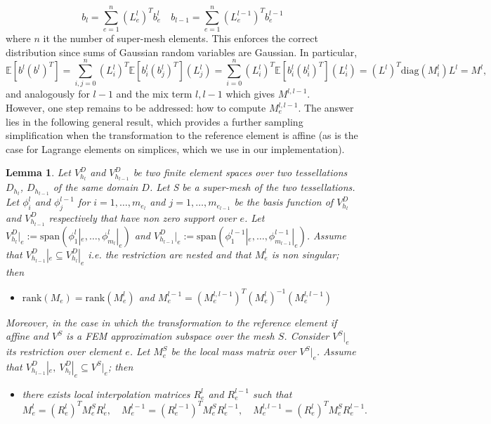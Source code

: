 \documentclass[a4paper, 11pt, oneside]{scrartcl}
\newtheorem{lemma}{Lemma}
\begin{document}
\begin{equation}
b_l = \sum_{e=1}^n (L_e^l)^T b_e^l \quad b_{l-1} = \sum_{e=1}^n (L_e^{l-1})^T b_e^{l-1}
\end{equation}
where \(n\) it the number of super-mesh elements. 
This enforces the correct distribution since sums of Gaussian random variables are Gaussian.
In particular,
\begin{equation}
\mathbb{E}[b^l(b^l)^T] = \sum_{i,j=0}^n (L_i^l)^T \mathbb{E}[b_i^l (b_j^l)^T] (L_j^l) = \sum_{i=0}^n (L_i^l)^T \mathbb{E}[b_i^l (b_i^l)^T] (L_i^l) = (L^l)^T \text{diag}(M_i^l) L^l = M^l,
\end{equation}
and analogously for \(l-1\)  and the mix term \(l,l-1\) which gives \(M^{l,l-1}\). \\
However, one step remains to be addressed: how to compute \( M_e^{l,l-1}\). The answer lies in the following general result, which provides a further sampling simplification when the transformation to the reference element is affine (as is the case for Lagrange elements on simplices, which we use in our implementation).  
\begin{lemma}
Let \(V_{h_l}^D\) and \( V_{h_{l-1}}^D\) be two finite element spaces over two tessellations \(D_{h_l}\), \( D_{h_{l-1}}\) of the same domain \(D\). Let S be a super-mesh of the two tessellations. Let \( \phi_i^l\) and \( \phi_j^{l-1}\) for \( i = 1, \dots ,m_{e_l}\) and \( j = 1, \dots, m_{e_{l-1}}\)   be the basis function of \(V_{h_l}^D\) and \( V_{h_{l-1}}^D\) respectively that have non zero support over \(e\). Let \(V_{h_l}^D|_e:=\text{span}(\phi_1^l|_e, \dots, \phi_{m_l}^l|_e)\) and  \( V_{h_{l-1}}^D|_e:=\text{span}(\phi_1^{l-1}|_e, \dots, \phi_{m_{l-1}}^{l-1}|_e )\). Assume that \(  V_{h_{l-1}}^D|_e \subseteq V_{h_l}^D|_e \) i.e. the restriction are nested and that \(M_e^l\) is non singular; then 
\begin{itemize}
\item \(\text{rank}(M_e) = \text{rank}(M_e^l) \) and \( M_e^{l-1}  = (M_e^{l,l-1})^T (M_e^l)^{-1} (M_e^{l,l-1})\)
\end{itemize}
Moreover, in the case in which the transformation to the reference element if affine and \(V^S\) is a FEM approximation subspace over the mesh \(S\). Consider \( V^S|_e\) its restriction over element \(e\). Let \( M_e^S\) be the local mass matrix over \(V^S|_e\). Assume that \(  V_{h_{l-1}}^D|_e, \ V_{h_l}^D|_e \subseteq V^S|_e \); then
\begin{itemize}
\item there exists local interpolation matrices \(R_e^l\) and \( R_e^{l-1}\) such that 
\[
M_e^l = (R_e^l)^T M_e^S R_e^l, \quad M_e^{l-1}=(R_e^{l-1})^T M_e^S R_e^{l-1}, \quad M_e^{l,l-1}= (R_e^l)^T M_e^S R_e^{l-1}.
\]
\end{itemize}
\end{lemma}
\end{document}
